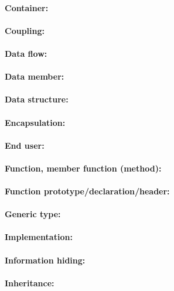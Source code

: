         \paragraph{   Container: }
        \paragraph{   Coupling: }
        \paragraph{   Data flow: }
        \paragraph{   Data member: }
        \paragraph{   Data structure: }
        \paragraph{   Encapsulation: }
        \paragraph{   End user: }
        \paragraph{   Function, member function (method): }
        \paragraph{   Function prototype/declaration/header: }
        \paragraph{   Generic type: }
        \paragraph{   Implementation: }
        \paragraph{   Information hiding: }
        \paragraph{   Inheritance: }
